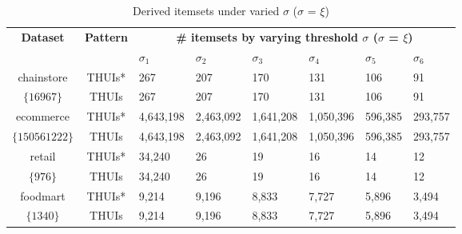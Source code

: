 \documentclass[journal]{IEEEtran}
\begin{document}
\begin{table}[htb]
	\fontsize{5pt}{9pt}\selectfont
	\centering
	\caption{Derived itemsets under varied $\sigma$ ($\sigma$ = $\xi$)}
	\label{table:thresholdsigma}
	\begin{tabular}{c|c|llllll}
		\hline \hline
		\multirow{2}{*}{\textbf{Dataset}} & \multirow{2}{*}{\textbf{Pattern}} & \multicolumn{6}{c}{\textbf{\# itemsets by varying threshold $\sigma$ ($\sigma$ = $\xi$)}} \\ \cline{3-8}
		& &$\sigma_1$ & $\sigma_2$ & $\sigma_3$ & $\sigma_4$ & $\sigma_5$ & $\sigma_6$ \\ \hline
		chainstore & THUIs* & 267 & 207 & 170 & 131 & 106 & 91 \\
		$\{16967\}$ & THUIs & 267 & 207 & 170 & 131 & 106 & 91 \\ \hline
		ecommerce & THUIs* & 4,643,198 & 2,463,092 & 1,641,208 & 1,050,396 & 596,385 & 293,757 \\
		$\{150561222\}$ & THUIs & 4,643,198 & 2,463,092 & 1,641,208 & 1,050,396 & 596,385 & 293,757 \\ \hline
		retail & THUIs* &34,240  & 26 & 19 & 16 & 14 & 12 \\
		$\{976\}$ & THUIs & 34,240 & 26 & 19 & 16 & 14 & 12 \\ \hline
		foodmart & THUIs* & 9,214 & 9,196 & 8,833 & 7,727 & 5,896 & 3,494 \\
		$\{1340\}$ & THUIs & 9,214 & 9,196 & 8,833 & 7,727 & 5,896 & 3,494 \\ \hline 
		\hline
	\end{tabular}
\end{table}
\end{document}
